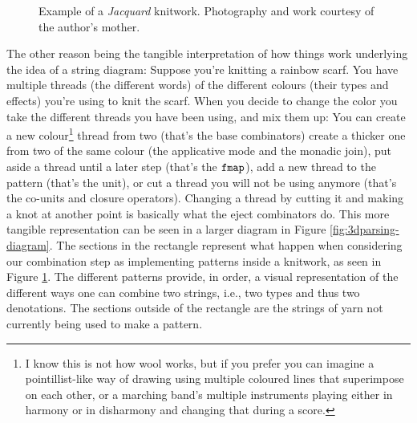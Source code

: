 \begin{figure}
	\centering
	\caption{Example of a \emph{Jacquard} knitwork.
		Photography and work courtesy of the author's mother.}
	\label{fig:knitting-example}
\end{figure}

The other reason being the tangible interpretation of how things work
underlying the idea of a string diagram:
Suppose you're knitting a rainbow scarf.
You have multiple threads (the different words) of the different colours (their
types and effects) you're using to knit the scarf.
When you decide to change the color you take the different threads you have
been using, and mix them up:
You can create a new colour\footnote{I know this is not how wool works, but
	if you prefer you can imagine a pointillist-like way of drawing using multiple
	coloured lines that superimpose on each other, or a marching band's multiple
	instruments playing either in harmony or in disharmony and changing that
	during a score.} thread from two (that's the base combinators) create a
thicker one from two of the same colour (the applicative mode and the monadic
join), put aside a thread until a later step (that's the $\texttt{fmap}$), add a new
thread to the pattern (that's the unit), or cut a thread you will not be
using anymore (that's the co-units and closure operators).
Changing a thread by cutting it and making a knot at another point is basically
what the eject combinators do.
This more tangible representation can be seen in a larger diagram in Figure
\ref{fig:3dparsing-diagram}.
The sections in the rectangle represent what happen when considering our
combination step as implementing patterns inside a knitwork, as seen in Figure
\ref{fig:knitting-example}.
The different patterns provide, in order, a visual representation of the
different ways one can combine two strings, i.e., two types and thus two
denotations.
The sections outside of the rectangle are the strings of yarn not currently
being used to make a pattern.

